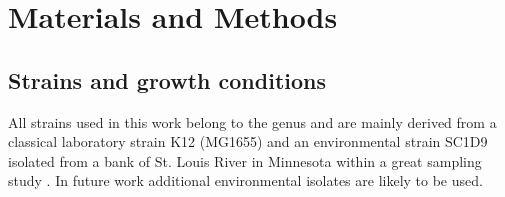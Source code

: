 \chapter{Materials and Methods}



\shorthandoff{-} 

\section{Strains and growth conditions}
All strains used in this work belong to the genus  and are mainly derived from a classical laboratory strain K12 (MG1655) and an environmental strain SC1\textunderscore D9 isolated from a bank of St. Louis River in Minnesota within a great sampling study \cite{ishii2006presence}.
In future work additional environmental isolates are likely to be used.

